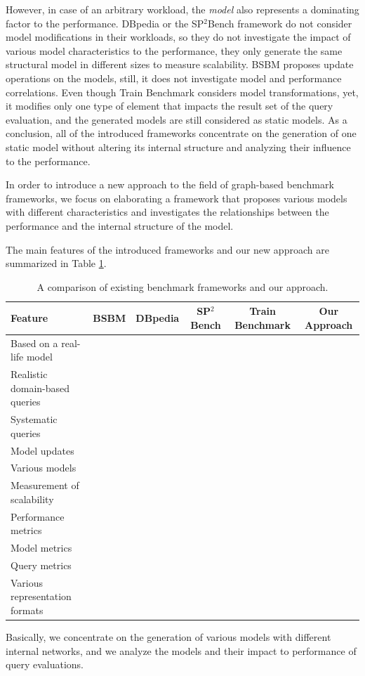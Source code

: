 However, in case of an arbitrary workload, the \textit{model} also represents a dominating factor to the performance. DBpedia or the SP$^2$Bench framework do not consider model modifications in their workloads, so they do not investigate the impact of various model characteristics to the performance, they only generate the same structural model in different sizes to measure scalability. BSBM proposes update operations on the models, still, it does not investigate model and performance correlations. Even though Train Benchmark considers model transformations, yet, it modifies only one type of element that impacts the result set of the query evaluation, and the generated models are still considered as static models. As a conclusion, all of the introduced frameworks concentrate on the generation of one static model without altering its internal structure and analyzing their influence to the performance.

In order to introduce a new approach to the field of graph-based benchmark frameworks, we focus on elaborating a framework that proposes various models with different characteristics and investigates the relationships between the performance and the internal structure of the model.

The main features of the introduced frameworks and our new approach are summarized in Table \ref{tab:framework_features}.
\begin{table}[ht]
	\footnotesize
	\centering
	\begin{tabular}{l c c c c c}
		\toprule
		Feature & BSBM & DBpedia & SP$^2$Bench & Train Benchmark & Our Approach\\ \hline
		\midrule
		Based on a real-life model &  & \textbullet & \textbullet & &  \\ \hline
		Realistic domain-based queries & \textbullet & \textbullet &  &  & \\ \hline
		Systematic queries  & &  & \textbullet & & \\ \hline
		Model updates & \textbullet &  &  & \textbullet & \\ \hline
		Various models &  &  &  & & \textbullet \\ \hline
		Measurement of scalability  & \textbullet & \textbullet & \textbullet & \textbullet & \textbullet\\ \hline
		Performance metrics  & \textbullet & \textbullet & \textbullet & &  \\ \hline
		Model metrics &  &  &  & & \textbullet \\ \hline
		Query metrics &  &  &  & & \textbullet \\ \hline
		Various representation formats & &  &  & \textbullet & \\ \hline
		\bottomrule
	\end{tabular}
	\caption{A comparison of existing benchmark frameworks and our approach.}
	\label{tab:framework_features}
\end{table}

Basically, we concentrate on the generation of various models with different internal networks, and we analyze the models and their impact to performance of query evaluations.